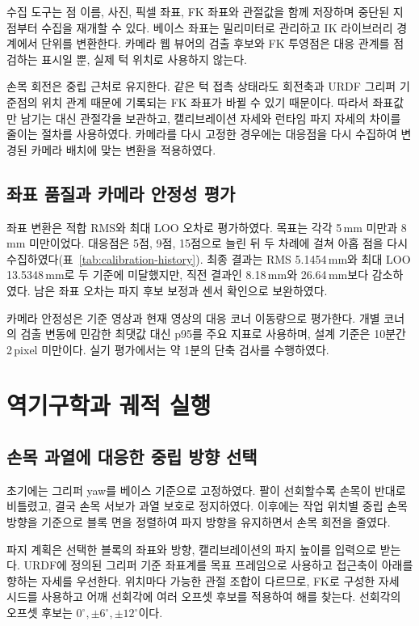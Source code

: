 수집 도구는 점 이름, 사진, 픽셀 좌표, FK 좌표와 관절값을 함께 저장하며 중단된 지점부터 수집을 재개할 수 있다. 베이스 좌표는 밀리미터로 관리하고 IK 라이브러리 경계에서 단위를 변환한다. 카메라 웹 뷰어의 검출 후보와 FK 투영점은 대응 관계를 점검하는 표시일 뿐, 실제 턱 위치로 사용하지 않는다.

손목 회전은 중립 근처로 유지한다. 같은 턱 접촉 상태라도 회전축과 URDF 그리퍼 기준점의 위치 관계 때문에 기록되는 FK 좌표가 바뀔 수 있기 때문이다. 따라서 좌표값만 남기는 대신 관절각을 보관하고, 캘리브레이션 자세와 런타임 파지 자세의 차이를 줄이는 절차를 사용하였다. 카메라를 다시 고정한 경우에는 대응점을 다시 수집하여 변경된 카메라 배치에 맞는 변환을 적용하였다.

\subsection{좌표 품질과 카메라 안정성 평가}
좌표 변환은 적합 RMS와 최대 LOO 오차로 평가하였다. 목표는 각각 5\,mm 미만과 8\,mm 미만이었다. 대응점은 5점, 9점, 15점으로 늘린 뒤 두 차례에 걸쳐 아홉 점을 다시 수집하였다(표~\ref{tab:calibration-history}). 최종 결과는 RMS 5.1454\,mm와 최대 LOO 13.5348\,mm로 두 기준에 미달했지만, 직전 결과인 8.18\,mm와 26.64\,mm보다 감소하였다. 남은 좌표 오차는 파지 후보 보정과 센서 확인으로 보완하였다.

카메라 안정성은 기준 영상과 현재 영상의 대응 코너 이동량으로 평가한다. 개별 코너의 검출 변동에 민감한 최댓값 대신 p95를 주요 지표로 사용하며, 설계 기준은 10분간 2\,pixel 미만이다. 실기 평가에서는 약 1분의 단축 검사를 수행하였다.
\FloatBarrier
\section{역기구학과 궤적 실행}
\subsection{손목 과열에 대응한 중립 방향 선택}
초기에는 그리퍼 yaw를 베이스 기준으로 고정하였다. 팔이 선회할수록 손목이 반대로 비틀렸고, 결국 손목 서보가 과열 보호로 정지하였다. 이후에는 작업 위치별 중립 손목 방향을 기준으로 블록 면을 정렬하여 파지 방향을 유지하면서 손목 회전을 줄였다.

파지 계획은 선택한 블록의 좌표와 방향, 캘리브레이션의 파지 높이를 입력으로 받는다. URDF에 정의된 그리퍼 기준 좌표계를 목표 프레임으로 사용하고 접근축이 아래를 향하는 자세를 우선한다. 위치마다 가능한 관절 조합이 다르므로, FK로 구성한 자세 시드를 사용하고 어깨 선회각에 여러 오프셋 후보를 적용하여 해를 찾는다. 선회각의 오프셋 후보는 $0^\circ,\pm6^\circ,\pm12^\circ$이다.

